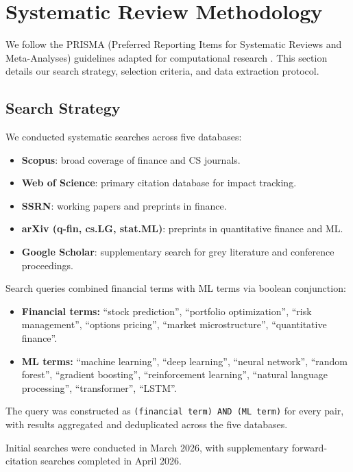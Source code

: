 \section{Systematic Review Methodology}\label{sec:methodology}

We follow the PRISMA (Preferred Reporting Items for Systematic Reviews and Meta-Analyses) guidelines adapted for computational research \citep{Page2021}. This section details our search strategy, selection criteria, and data extraction protocol.

\subsection{Search Strategy}

We conducted systematic searches across five databases:
\begin{itemize}[leftmargin=*]
    \item \textbf{Scopus}: broad coverage of finance and CS journals.
    \item \textbf{Web of Science}: primary citation database for impact tracking.
    \item \textbf{SSRN}: working papers and preprints in finance.
    \item \textbf{arXiv (q-fin, cs.LG, stat.ML)}: preprints in quantitative finance and ML.
    \item \textbf{Google Scholar}: supplementary search for grey literature and conference proceedings.
\end{itemize}

Search queries combined financial terms with ML terms via boolean conjunction:

\begin{itemize}[leftmargin=*]
    \item \textbf{Financial terms:} ``stock prediction'', ``portfolio optimization'', ``risk management'', ``options pricing'', ``market microstructure'', ``quantitative finance''.
    \item \textbf{ML terms:} ``machine learning'', ``deep learning'', ``neural network'', ``random forest'', ``gradient boosting'', ``reinforcement learning'', ``natural language processing'', ``transformer'', ``LSTM''.
\end{itemize}

The query was constructed as \texttt{(financial term) AND (ML term)} for every pair, with results aggregated and deduplicated across the five databases.

Initial searches were conducted in March 2026, with supplementary forward-citation searches completed in April 2026.

